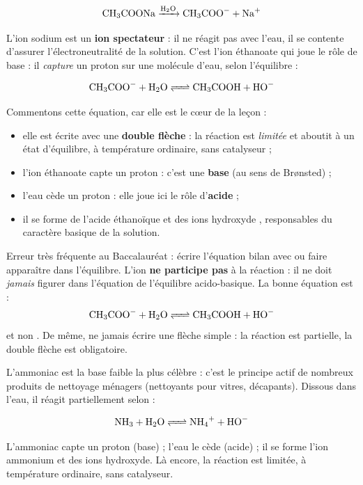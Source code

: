 \documentclass[11pt]{article}
\newcounter{popsec}
\newcounter{popsub}
\newcommand{\courssub}[1]{%
  \stepcounter{popsub}%
  \par\vspace{9pt}\noindent{\popxbold\fontsize{11.5}{13}\selectfont\color{popink}{\color{poporange}\thepopsec.\thepopsub}\hspace{6pt}#1}\par\nopagebreak\vspace{4pt}
}
\begin{document}
\[ \ce{CH3COONa ->[H2O] CH3COO- + Na+} \]

L'ion sodium  est un \textbf{ion spectateur} : il ne réagit pas avec l'eau, il se contente d'assurer l'électroneutralité de la solution. C'est l'ion éthanoate  qui joue le rôle de base : il \emph{capture} un proton  sur une molécule d'eau, selon l'équilibre :

\[ \ce{CH3COO- + H2O <=> CH3COOH + HO-} \]

Commentons cette équation, car elle est le cœur de la leçon :
\begin{itemize}
\item elle est écrite avec une \textbf{double flèche} \ce{<=>} : la réaction est \emph{limitée} et aboutit à un état d'équilibre, à température ordinaire, sans catalyseur ;
\item l'ion éthanoate  capte un proton : c'est une \textbf{base} (au sens de Brønsted) ;
\item l'eau  cède un proton : elle joue ici le rôle d'\textbf{acide} ;
\item il se forme de l'acide éthanoïque  et des ions hydroxyde , responsables du caractère basique de la solution.
\end{itemize}

\begin{attention}
Erreur très fréquente au Baccalauréat : écrire l'équation bilan avec  ou faire apparaître  dans l'équilibre. L'ion  \textbf{ne participe pas} à la réaction : il ne doit \emph{jamais} figurer dans l'équation de l'équilibre acido-basique. La bonne équation est :
\[ \ce{CH3COO- + H2O <=> CH3COOH + HO-} \]
et non . De même, ne jamais écrire une flèche simple \ce{->} : la réaction est partielle, la double flèche est obligatoire.
\end{attention}

\courssub{Cas de l'ammoniac \ce{NH3}}

L'ammoniac est la base faible la plus célèbre : c'est le principe actif de nombreux produits de nettoyage ménagers (nettoyants pour vitres, décapants). Dissous dans l'eau, il réagit partiellement selon :

\[ \ce{NH3 + H2O <=> NH4+ + HO-} \]

L'ammoniac  capte un proton (base) ; l'eau le cède (acide) ; il se forme l'ion ammonium  et des ions hydroxyde. Là encore, la réaction est limitée, à température ordinaire, sans catalyseur.
\end{document}
